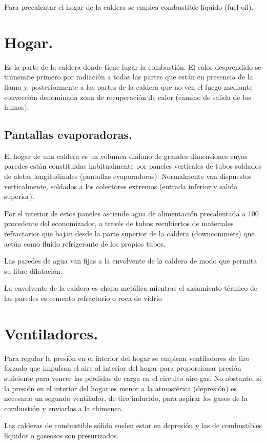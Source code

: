 Para precalentar el hogar de la caldera se emplea combustible líquido (fuel-oil).
\section{Hogar.}
Es la parte de la caldera donde tiene lugar la combustión. El calor desprendido se transmite primero por radiación a todas las partes que están en presencia de la llama y, posteriormente a las partes de la caldera que no ven el fuego mediante convección denominada zona de recuperación de calor (camino de salida de los humos).
\subsection{Pantallas evaporadoras.}
El hogar de una caldera es un volumen diáfano de grandes dimensiones cuyas paredes están
constituidas habitualmente por paneles verticales de tubos soldados de aletas longitudinales
(pantallas evaporadoras). Normalmente van dispuestos verticalmente, soldados a los colectores
extremos (entrada inferior y salida superior).




Por el interior de estos paneles asciende agua de alimentación precalentada a 100\grado $\ $ procedente del economizador, a través de tubos recubiertos de materiales refractarios que bajan desde la parte superior de la caldera (downcommers) que actúa como fluido refrigerante de los propios tubos.


Las paredes de agua van fijas a la envolvente de la caldera de modo que permita su libre
dilatación. 


La envolvente de la caldera es chapa metálica mientras el aislamiento térmico de las paredes
es cemento refractario o roca de vidrio
\section{Ventiladores.}
Para regular la presión en el interior del hogar se emplean ventiladores de tiro forzado que impulsan el aire al interior del hogar para proporcionar presión suficiente para vencer las pérdidas de carga en el circuito aire-gas. No obstante, si la presión en el interior del hogar es menor a la atmosférica (depresión) es necesario un segundo ventilador, de tiro inducido, para aspirar los gases de la combustión y enviarlos a la chimenea.



Las calderas de combustible sólido suelen estar en depresión y las de combustibles líquidos o gaseosos son presurizados.



